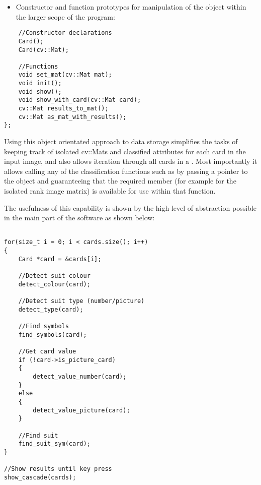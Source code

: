 \begin{itemize}
	\item Constructor and function prototypes for manipulation of the object within the larger scope of the program:
\end{itemize}

\begin{lstlisting}
	//Constructor declarations
	Card();
	Card(cv::Mat);

	//Functions
	void set_mat(cv::Mat mat);
	void init();
	void show();
	void show_with_card(cv::Mat card);
	cv::Mat results_to_mat();
	cv::Mat as_mat_with_results();
};
\end{lstlisting}

Using this object orientated approach to data storage simplifies the tasks of keeping track of isolated cv::Mats and classified attributes for each card in the input image, and also allows iteration through all cards in a . Most importantly it allows calling any of the classification functions such as  by passing a pointer to the object and guaranteeing that the required member (for example  for the isolated rank image matrix) is available for use within that function.

The usefulness of this capability is shown by the high level of abstraction possible in the main part of the software as shown below:

\begin{lstlisting}

for(size_t i = 0; i < cards.size(); i++)
{
    Card *card = &cards[i];

    //Detect suit colour
    detect_colour(card);

    //Detect suit type (number/picture)
    detect_type(card);

    //Find symbols
    find_symbols(card);

    //Get card value
    if (!card->is_picture_card)
    {
        detect_value_number(card);
    }
    else
    {
        detect_value_picture(card);
    }

    //Find suit
    find_suit_sym(card);
}

//Show results until key press
show_cascade(cards);
\end{lstlisting}